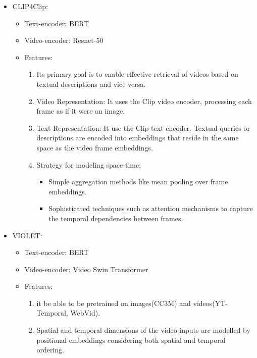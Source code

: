 \begin{itemize}
\item CLIP4Clip:
\begin{itemize}
\item Text-encoder: BERT
\item Video-encoder: Resnet-50
\item Features:
\begin{enumerate}
\item Its primary goal is to enable effective retrieval of videos based on textual descriptions and vice versa. 
\item Video Representation: It uses the Clip video encoder, processing each frame as if it were an image.
\item Text Representation: It use the Clip text encoder. Textual queries or descriptions are encoded into embeddings that reside in the same space as the video frame embeddings.
\item Strategy for modeling space-time:
\begin{itemize}
\item Simple aggregation methods like mean pooling over frame embeddings.
\item Sophisticated techniques such as attention mechanisms to capture the temporal dependencies between frames.
\end{itemize}
\end{enumerate}
\end{itemize}
\end{itemize}

\begin{itemize}
\item 	VIOLET:
\begin{itemize}
\item Text-encoder: BERT
\item Video-encoder: Video Swin Transformer
\item Features:
\begin{enumerate}
\item it be able to be pretrained on images(CC3M) and videos(YT-Temporal, WebVid).
\item Spatial and temporal dimensions of the video inputs are modelled by positional embeddings considering both spatial and temporal ordering. 
\end{enumerate}
\end{itemize}
\end{itemize}

